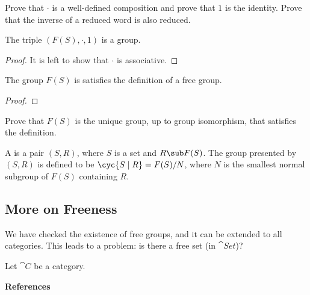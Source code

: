 \documentclass[10pt]{article}
\begin{document}
\begin{problem}
    Prove that $\cdot$ is a well-defined composition and prove that $1$ is the identity. Prove that the inverse of a reduced word is also reduced.
\end{problem}
\begin{proposition}
    The triple $(F(S),\cdot,1)$ is a group.
\end{proposition}
\begin{proof}
    It is left to show that $\cdot$ is associative. 
\end{proof}

\begin{proposition}
    The group $F(S)$ is satisfies the definition of a free group.
\end{proposition}
\begin{proof}
    
\end{proof}
\begin{problem}
    Prove that $F(S)$ is the unique group, up to group isomorphism, that satisfies the definition.
\end{problem}
\begin{adefinition}
    A  is a pair $(S,R)$, where $S$ is a set and $R\sub F(S)$. The group presented by $(S,R)$ is defined to be $\cyc{S\mid R}=F(S)/N$, where $N$ is the smallest normal subgroup of $F(S)$ containing $R$.
\end{adefinition}
\subsection{More on Freeness}
We have checked the existence of free groups, and it can be extended to all categories. This leads to a problem: is there a free set (in $\cat{Set}$)?
\begin{definition}
    Let $\cat{C}$ be a category.
\end{definition}


\vspace{\baselineskip}
\begin{center}
    \large\bfseries References\normalsize
\end{center}
\hindex 
\end{document}
